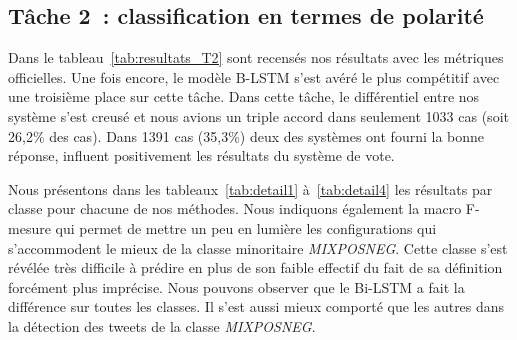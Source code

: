 \subsection{Tâche 2~: classification en termes de polarité}


Dans le tableau~\ref{tab:resultats_T2} sont recensés nos résultats avec les métriques officielles.
Une fois encore, le modèle B-LSTM s'est avéré le plus compétitif avec une troisième place sur cette tâche.
Dans cette tâche, le différentiel entre nos système s'est creusé et nous avions un triple accord dans seulement 1033 cas (soit 26,2\% des cas). Dans 1391 cas (35,3\%) deux des systèmes ont fourni la bonne réponse, influent positivement les résultats du système de vote.





Nous présentons dans les tableaux~\ref{tab:detail1} à~\ref{tab:detail4} les résultats par classe pour chacune de nos méthodes.
Nous indiquons également la macro F-mesure qui permet de mettre un peu en lumière les configurations qui s'accommodent le mieux de la classe minoritaire \emph{MIXPOSNEG}.
Cette classe s'est révélée très difficile à prédire en plus de son faible effectif du fait de sa définition forcément plus imprécise.
Nous pouvons observer que le Bi-LSTM a fait la différence sur toutes les classes.
Il s'est aussi mieux comporté que les autres dans la détection des tweets de la classe \emph{MIXPOSNEG}.




